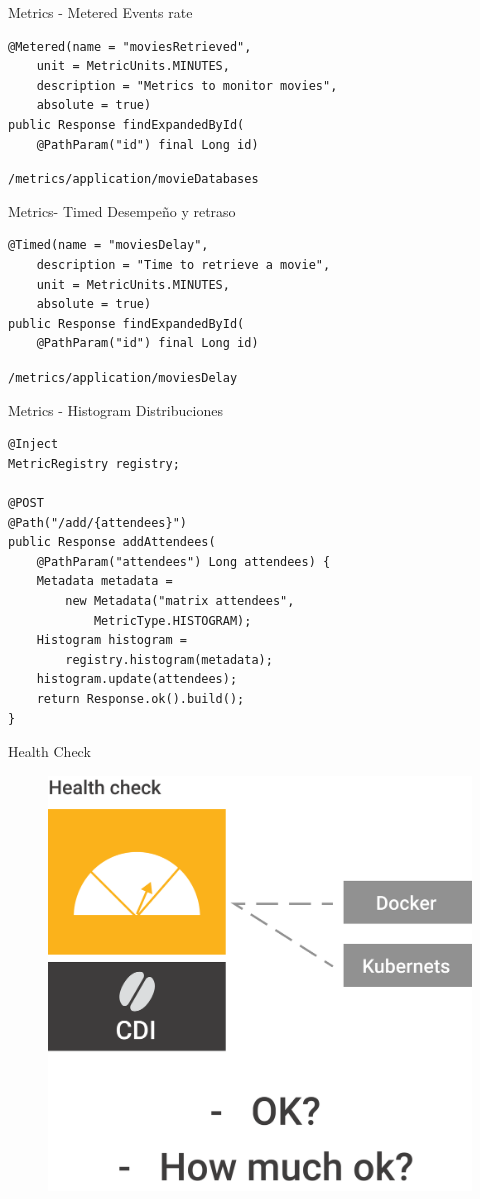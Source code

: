 \documentclass{beamer}
\begin{document}
\begin{frame}[fragile]{Metrics - Metered}
Events rate
\begin{lstlisting}
@Metered(name = "moviesRetrieved",
	unit = MetricUnits.MINUTES,
	description = "Metrics to monitor movies",
	absolute = true)
public Response findExpandedById(
	@PathParam("id") final Long id) 
\end{lstlisting}

\lstinline|/metrics/application/movieDatabases|
\end{frame}

\begin{frame}[fragile]{Metrics- Timed}
Desempeño y retraso
\begin{lstlisting}
@Timed(name = "moviesDelay",
	description = "Time to retrieve a movie",
	unit = MetricUnits.MINUTES,
	absolute = true)
public Response findExpandedById(
	@PathParam("id") final Long id) 
\end{lstlisting}

\lstinline|/metrics/application/moviesDelay|
\end{frame}

\begin{frame}[fragile]{Metrics - Histogram}
Distribuciones 
\begin{lstlisting}
@Inject
MetricRegistry registry;

@POST
@Path("/add/{attendees}")
public Response addAttendees(
	@PathParam("attendees") Long attendees) {
	Metadata metadata =
		new Metadata("matrix attendees",
			MetricType.HISTOGRAM);
	Histogram histogram = 
		registry.histogram(metadata);
	histogram.update(attendees);
	return Response.ok().build();
}
\end{lstlisting}

\end{frame}

\begin{frame}{Health Check}
\begin{figure}
	\centering
	\includegraphics[width=0.75\linewidth]{Images/healthcheck}
\end{figure}
\end{frame}
\end{document}
